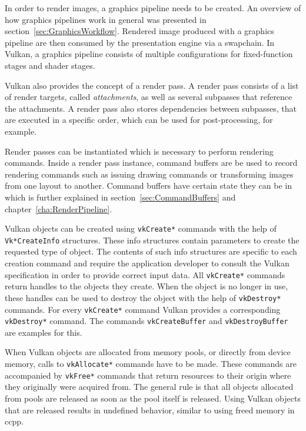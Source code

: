     In order to render images, a graphics pipeline needs to be created.
    An overview of how graphics pipelines work in general was presented in section~\ref{sec:GraphicsWorkflow}.
    Rendered image produced with a graphics pipeline are then consumed by the presentation engine via a swapchain.
    In Vulkan, a graphics pipeline consists of multiple configurations for fixed-function stages and shader stages.

    Vulkan also provides the concept of a render pass.
    A render pass consists of a list of render targets, called \textit{attachments}, as well as several subpasses that reference the attachments.
    A render pass also stores dependencies between subpasses, that are executed in a specific order, which can be used for post-processing, for example.

    Render passes can be instantiated which is necessary to perform rendering commands.
    Inside a render pass instance, command buffers are be used to record rendering commands such as issuing drawing commands or transforming images from one layout to another.
    Command buffers have certain state they can be in which is further explained in section~\ref{sec:CommandBuffers} and chapter~\ref{cha:RenderPipeline}.

    Vulkan objects can be created using \lstinline{vkCreate*} commands with the help of \lstinline{Vk*CreateInfo} structures.
    These info structures contain parameters to create the requested type of object.
    The contents of such info structures are specific to each creation command and require the \gls{application} developer to consult the Vulkan specification in order to provide correct input data.
    All \lstinline{vkCreate*} commands return handles to the objects they create.
    When the object is no longer in use, these handles can be used to destroy the object with the help of \lstinline{vkDestroy*} commands.
    For every \lstinline{vkCreate*} command Vulkan provides a corresponding \lstinline{vkDestroy*} command.
    The commands \lstinline{vkCreateBuffer} and \lstinline{vkDestroyBuffer} are examples for this.

    When Vulkan objects are allocated from memory pools, or directly from \gls{device} memory, calls to \lstinline{vkAllocate*} commands have to be made.
    These commands are accompanied by \lstinline{vkFree*} commands that return resources to their origin where they originally were acquired from.
    The general rule is that all objects allocated from pools are released as soon as the pool itself is released.
    Using Vulkan objects that are released results in undefined behavior, similar to using freed memory in \gls{ccpp}.

